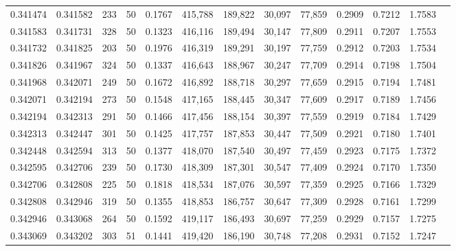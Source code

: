 \begin{tabular}{rrrrrrrrrrrrr}
0.341474 & 0.341582 &   233 &  50 &                                     0.1767 & 415,788 & 189,822 &  30,097 &  77,859 & 0.2909 & 0.7212 & 1.7583 \\
0.341583 & 0.341731 &   328 &  50 &                                     0.1323 & 416,116 & 189,494 &  30,147 &  77,809 & 0.2911 & 0.7207 & 1.7553 \\
0.341732 & 0.341825 &   203 &  50 &                                     0.1976 & 416,319 & 189,291 &  30,197 &  77,759 & 0.2912 & 0.7203 & 1.7534 \\
0.341826 & 0.341967 &   324 &  50 &                                     0.1337 & 416,643 & 188,967 &  30,247 &  77,709 & 0.2914 & 0.7198 & 1.7504 \\
0.341968 & 0.342071 &   249 &  50 &                                     0.1672 & 416,892 & 188,718 &  30,297 &  77,659 & 0.2915 & 0.7194 & 1.7481 \\
0.342071 & 0.342194 &   273 &  50 &                                     0.1548 & 417,165 & 188,445 &  30,347 &  77,609 & 0.2917 & 0.7189 & 1.7456 \\
0.342194 & 0.342313 &   291 &  50 &                                     0.1466 & 417,456 & 188,154 &  30,397 &  77,559 & 0.2919 & 0.7184 & 1.7429 \\
0.342313 & 0.342447 &   301 &  50 &                                     0.1425 & 417,757 & 187,853 &  30,447 &  77,509 & 0.2921 & 0.7180 & 1.7401 \\
0.342448 & 0.342594 &   313 &  50 &                                     0.1377 & 418,070 & 187,540 &  30,497 &  77,459 & 0.2923 & 0.7175 & 1.7372 \\
0.342595 & 0.342706 &   239 &  50 &                                     0.1730 & 418,309 & 187,301 &  30,547 &  77,409 & 0.2924 & 0.7170 & 1.7350 \\
0.342706 & 0.342808 &   225 &  50 &                                     0.1818 & 418,534 & 187,076 &  30,597 &  77,359 & 0.2925 & 0.7166 & 1.7329 \\
0.342808 & 0.342946 &   319 &  50 &                                     0.1355 & 418,853 & 186,757 &  30,647 &  77,309 & 0.2928 & 0.7161 & 1.7299 \\
0.342946 & 0.343068 &   264 &  50 &                                     0.1592 & 419,117 & 186,493 &  30,697 &  77,259 & 0.2929 & 0.7157 & 1.7275 \\
0.343069 & 0.343202 &   303 &  51 &                                     0.1441 & 419,420 & 186,190 &  30,748 &  77,208 & 0.2931 & 0.7152 & 1.7247 \\

\end{tabular}
